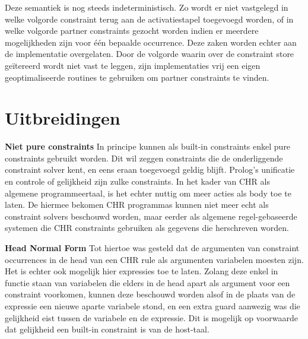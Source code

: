 Deze semantiek is nog steeds indeterministisch. Zo wordt er niet vastgelegd in welke volgorde constraint terug aan de activatiestapel toegevoegd worden, of in welke volgorde partner constraints gezocht worden indien er meerdere mogelijkheden zijn voor \'e\'en bepaalde occurrence. Deze zaken worden echter aan de implementatie overgelaten. Door de volgorde waarin over de constraint store ge\"itereerd wordt niet vast te leggen, zijn implementaties vrij een eigen geoptimaliseerde routines te gebruiken om partner constraints te vinden.

\section{Uitbreidingen}

{\bf Niet pure constraints} In principe kunnen als built-in constraints enkel pure constraints gebruikt worden. Dit wil zeggen constraints die de onderliggende constraint solver kent, en eens eraan toegevoegd geldig blijft. Prolog's unificatie en controle of gelijkheid zijn zulke constraints. In het kader van CHR als algemene programmeertaal, is het echter nuttig om meer acties als body toe te laten. De hiermee bekomen CHR programmas kunnen niet meer echt als constraint solvers beschouwd worden, maar eerder als algemene regel-gebaseerde systemen die CHR constraints gebruiken als gegevens die herschreven worden.

{\bf Head Normal Form} Tot hiertoe was gesteld dat de argumenten van constraint occurrences in de head van een CHR rule als argumenten variabelen moesten zijn. Het is echter ook mogelijk hier expressies toe te laten. Zolang deze enkel in functie staan van variabelen die elders in de head apart als argument voor een constraint voorkomen, kunnen deze beschouwd worden alsof in de plaats van de expressie een nieuwe aparte variabele stond, en een extra guard aanwezig was die gelijkheid eist tussen de variabele en de expressie. Dit is mogelijk op voorwaarde dat gelijkheid een built-in constraint is van de host-taal.

